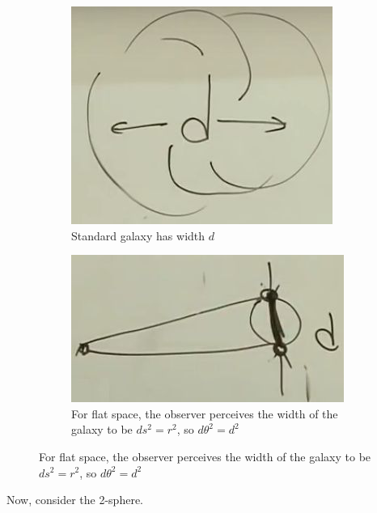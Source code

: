 \documentclass[]{article}
\begin{document}
\begin{figure}[H]
	\caption{Standard Galaxies in flat space}
	\begin{subfigure}[t]{0.45\textwidth}
		\caption{Standard galaxy has width $d$}
		\includegraphics[width=\textwidth]{cosmo-3-3-standard-galaxy}
	\end{subfigure}
	\begin{subfigure}[t]{0.45\textwidth}
		\caption{For flat space, the observer perceives the width of the galaxy to be $ds^2 = r^2$, so $d\theta^2 = d^2$}
		\includegraphics[width=\textwidth]{cosmo-3-3-standard-galaxy-flat-space}
	\end{subfigure}
\end{figure}

Now, consider the 2-sphere.
\end{document}
